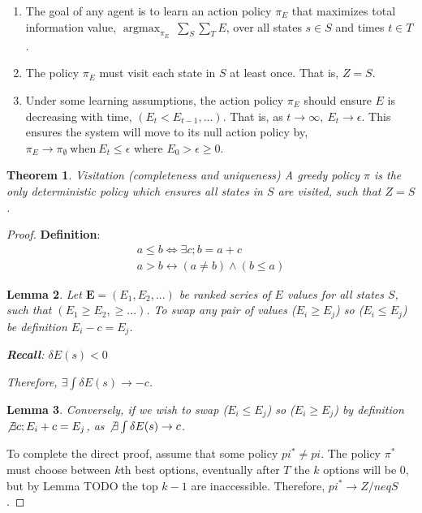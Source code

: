 \documentclass[9pt,twocolumn,twoside]{pnas-new}
\DeclareMathOperator*{\argmax}{argmax}
\newtheorem{theorem}{Theorem}
\newtheorem{lemma}[theorem]{Lemma}
\begin{document}
\begin{enumerate}[noitemsep,wide=0pt,leftmargin=\dimexpr\labelwidth+2\labelsep\relax]
    \item The goal of any agent is to learn an action policy $\pi_E$ that maximizes total information value, $\argmax_{\pi_E} \ \sum_S \sum_T E$, over all states $s \in S$ and times $t \in T$.
    \item The policy $\pi_E$ must visit each state in $S$ at least once. That is, $Z = S$.
    \item Under some learning assumptions, the action policy $\pi_E$ should ensure $E$ is decreasing with time, $(E_t < E_{t-1}, ...)$. That is, as $t \rightarrow \infty,\ E_t \rightarrow \epsilon$. This ensures the system will move to its null action policy by, $\pi_E \rightarrow \pi_{\emptyset} \ \text{when} \ E_t \leq \epsilon$ where $E_0 > \epsilon \geq 0$.
\end{enumerate}

\begin{theorem}{Visitation (completeness and uniqueness)}
A greedy policy $\pi$ is the only deterministic policy which ensures all states in $S$ are visited, such that $Z = S$.
\end{theorem}

\begin{proof}
    \textbf{Definition}: 
    \begin{align}
        a \leq b \Leftrightarrow \exists c; b = a + c \\
        a > b \leftrightarrow (a \neq b) \wedge (b \leq a) 
    \end{align}

    \begin{lemma}
    Let $\textbf{E} = (E_1, E_2, ...)$ be ranked series of $E$ values for all states $S$, such that $(E_1 \geq E_2, \geq ...)$. To swap any pair of values ($E_i \geq E_j$) so ($E_i \leq E_j$) be definition $E_i - c = E_j$.  

    \textbf{Recall}: $\delta E(s) < 0$ 

    Therefore, $\exists \int \delta E(s) \rightarrow -c$. 
    \end{lemma}

    \begin{lemma}
    Conversely, if we wish to swap ($E_i \leq E_j$) so ($E_i \geq E_j$) by definition $\not \exists c; E_i + c = E_j$, as $\not \exists \int \delta E(s) \rightarrow c$. 
    \end{lemma}

    To complete the direct proof, assume that some policy $pi^* \neq pi$. The policy $\pi^*$ must choose between $k$th best options, eventually after $T$ the $k$ options will be 0, but by Lemma TODO the top $k-1$ are inaccessible. Therefore, $pi^* \rightarrow Z /neq S$.
\end{proof}
\end{document}
